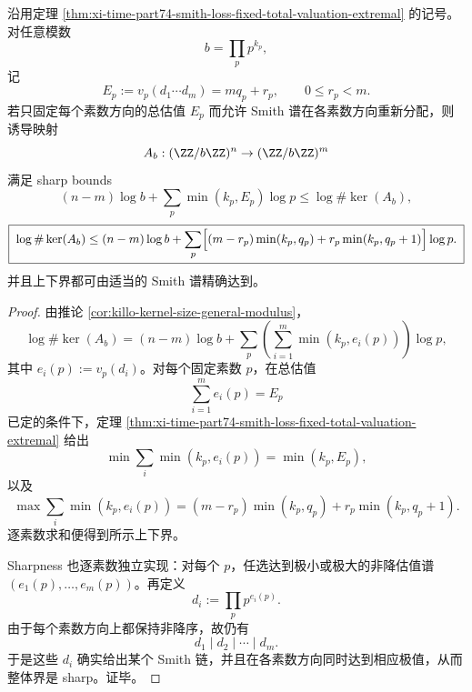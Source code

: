 \begin{corollary}\label{cor:xi-time-part74-general-modulus-kernel-loss-extremal}
沿用定理 \ref{thm:xi-time-part74-smith-loss-fixed-total-valuation-extremal} 的记号。对任意模数
\[
b=\prod_p p^{k_p},
\]
记
\[
E_p:=v_p(d_1\cdots d_m)=mq_p+r_p,
\qquad
0\le r_p<m.
\]
若只固定每个素数方向的总估值 \(E_p\) 而允许 Smith 谱在各素数方向重新分配，则诱导映射
\[
A_b:(\ZZ/b\ZZ)^n\to(\ZZ/b\ZZ)^m
\]
满足 sharp bounds
\[
\boxed{\;
(n-m)\log b+\sum_p \min(k_p,E_p)\log p
\le
\log \#\ker(A_b),\;}
\]
\[
\boxed{\;
\log \#\ker(A_b)
\le
(n-m)\log b+\sum_p\Bigl[(m-r_p)\min(k_p,q_p)+r_p\min(k_p,q_p+1)\Bigr]\log p.\;}
\]
并且上下界都可由适当的 Smith 谱精确达到。
\end{corollary}
\begin{proof}
由推论 \ref{cor:killo-kernel-size-general-modulus}，
\[
\log \#\ker(A_b)
=
(n-m)\log b+\sum_p\left(\sum_{i=1}^{m}\min(k_p,e_i(p))\right)\log p,
\]
其中 \(e_i(p):=v_p(d_i)\)。对每个固定素数 \(p\)，在总估值
\[
\sum_{i=1}^{m}e_i(p)=E_p
\]
已定的条件下，定理 \ref{thm:xi-time-part74-smith-loss-fixed-total-valuation-extremal} 给出
\[
\min \sum_i\min(k_p,e_i(p))=\min(k_p,E_p),
\]
以及
\[
\max \sum_i\min(k_p,e_i(p))
=(m-r_p)\min(k_p,q_p)+r_p\min(k_p,q_p+1).
\]
逐素数求和便得到所示上下界。

Sharpness 也逐素数独立实现：对每个 \(p\)，任选达到极小或极大的非降估值谱 \((e_1(p),\dots,e_m(p))\)。再定义
\[
d_i:=\prod_p p^{e_i(p)}.
\]
由于每个素数方向上都保持非降序，故仍有
\[
d_1\mid d_2\mid \cdots \mid d_m.
\]
于是这些 \(d_i\) 确实给出某个 Smith 链，并且在各素数方向同时达到相应极值，从而整体界是 sharp。证毕。
\end{proof}

